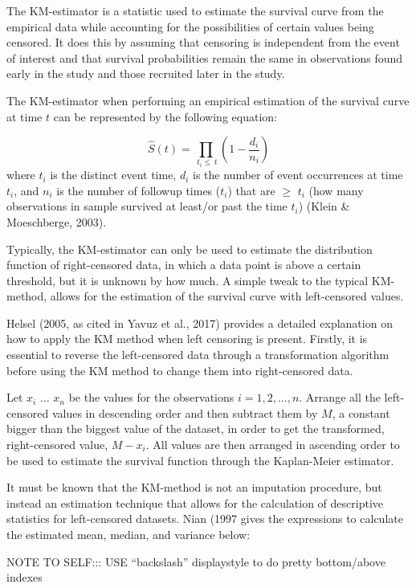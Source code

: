 \documentclass[12pt, twoside]{amherstthesis}
\begin{document}
The KM-estimator is a statistic used to estimate the survival curve from the empirical data while accounting for the possibilities of certain values being censored. It does this by assuming that censoring is independent from the event of interest and that survival probabilities remain the same in observations found early in the study and those recruited later in the study.

The KM-estimator when performing an empirical estimation of the survival curve at time \(t\) can be represented by the following equation:

\[\hat{S}(t) = \prod_{\ t_i \le \ t }\left(1-\frac{d_i}{n_i}\right)\]
where \(t_i\) is the distinct event time, \(d_i\) is the number of event occurrences at time \(t_i\), and \(n_i\) is the number of followup times (\(t_i\)) that are \(\ge\) \(t_i\) (how many observations in sample survived at least/or past the time \(t_i\)) (Klein \& Moeschberge, 2003).

Typically, the KM-estimator can only be used to estimate the distribution function of right-censored data, in which a data point is above a certain threshold, but it is unknown by how much. A simple tweak to the typical KM-method, allows for the estimation of the survival curve with left-censored values.

Helsel (2005, as cited in Yavuz et al., 2017) provides a detailed explanation on how to apply the KM method when left censoring is present. Firstly, it is essential to reverse the left-censored data through a transformation algorithm before using the KM method to change them into right-censored data.

Let \(x_i\) \(\ldots\) \(x_n\) be the values for the observations \(i = 1, 2, ..., n\). Arrange all the left-censored values in descending order and then subtract them by \(M\), a constant bigger than the biggest value of the dataset, in order to get the transformed, right-censored value, \(M-x_i\). All values are then arranged in ascending order to be used to estimate the survival function through the Kaplan-Meier estimator.

It must be known that the KM-method is not an imputation procedure, but instead an estimation technique that allows for the calculation of descriptive statistics for left-censored datasets. Nian (1997 gives the expressions to calculate the estimated mean, median, and variance below:

NOTE TO SELF::: USE ``backslash'' displaystyle to do pretty bottom/above indexes
\end{document}
